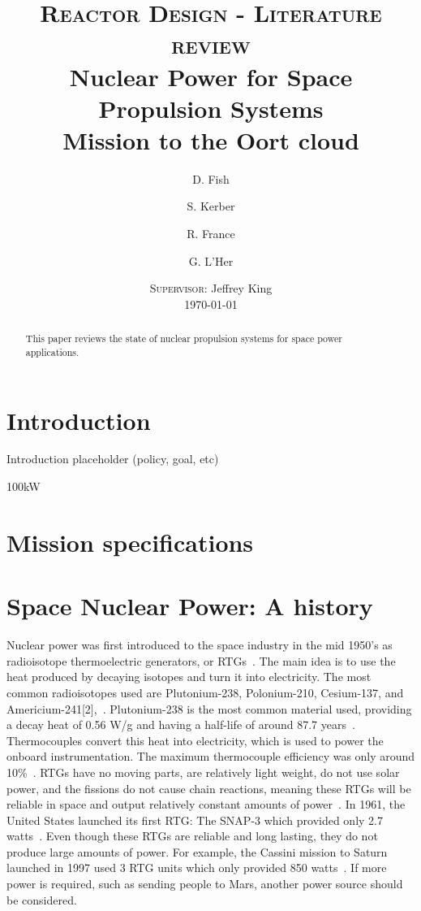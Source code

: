 \documentclass{article}
\title{
\textsc{Reactor Design - Literature review}\\[2.6cm]
{\LARGE \bfseries Nuclear Power for Space Propulsion Systems}\\{\Large\bfseries Mission to the Oort cloud}
}
\author{
D. Fish 
\and 
S. Kerber
\and
R. France
\and
G. L'Her
}
\date{
\textsc{Supervisor:} Jeffrey King\\[1em]
\today
}
\begin{document}
\maketitle
\newpage

\begin{abstract}%
This paper reviews the state of nuclear propulsion systems for space power applications.
\end{abstract}
\newpage



\section{Introduction}
\label{sec:intro}
Introduction placeholder (policy, goal, etc)

100kW

\section{Mission specifications}


\section{Space Nuclear Power: A history}
\label{sec:bkgd}


Nuclear power was first introduced to the space industry in the mid 1950's as radioisotope thermoelectric generators, or RTGs~\cite{doe0071}. The main idea is to use the heat produced by decaying isotopes and turn it into electricity. The most common radioisotopes used are Plutonium-238, Polonium-210, Cesium-137, and Americium-241[2],~\cite{webworldnuclear}. Plutonium-238 is the most common material used, providing a decay heat of 0.56 W/g and having a half-life of around 87.7 years~\cite{webworldnuclear}. Thermocouples convert this heat into electricity, which is used to power the onboard instrumentation. The maximum thermocouple efficiency was only around 10\%~\cite{engler1987atomic}. RTGs have no moving parts, are relatively light weight, do not use solar power, and the fissions do not cause chain reactions, meaning these RTGs will be reliable in space and output relatively constant amounts of power~\cite{engler1987atomic}. In 1961, the United States launched its first RTG: The SNAP-3 which provided only 2.7 watts~\cite{doe0071}. Even though these RTGs are reliable and long lasting, they do not produce large amounts of power. For example, the Cassini mission to Saturn launched in 1997 used 3 RTG units which only provided 850 watts~\cite{doe0071}. If more power is required, such as sending people to Mars, another power source should be considered.
\end{document}

